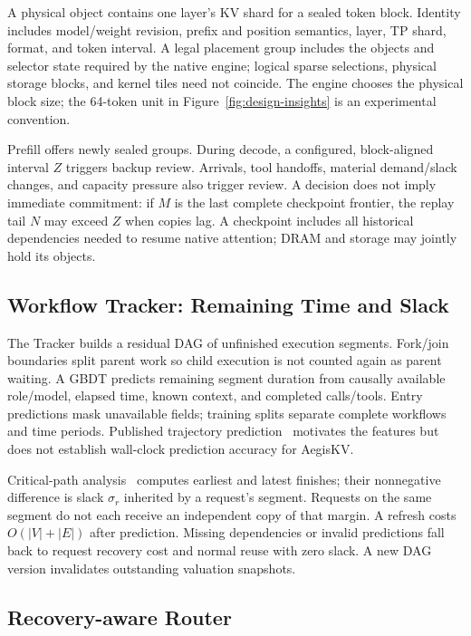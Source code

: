 A physical object contains one layer's KV shard for a sealed token block.
Identity includes model/weight revision, prefix and position semantics,
layer, TP shard, format, and token interval. A legal placement group
includes the objects and selector state required by the native engine;
logical sparse selections, physical storage blocks, and kernel tiles need
not coincide. The engine chooses the physical block size; the 64-token
unit in Figure~\ref{fig:design-insights} is an experimental convention.

Prefill offers newly sealed groups. During decode, a configured,
block-aligned interval $Z$ triggers backup review. Arrivals, tool handoffs,
material demand/slack changes, and capacity pressure also trigger review.
A decision does not imply immediate commitment: if $M$ is the last
complete checkpoint frontier, the replay tail $N$ may exceed $Z$ when
copies lag. A checkpoint includes all historical dependencies needed to
resume native attention; DRAM and storage may jointly hold its objects.

\subsection{Workflow Tracker: Remaining Time and Slack}
\label{sec:workflow-protection}

The Tracker builds a residual DAG of unfinished execution segments.
Fork/join boundaries split parent work so child execution is not counted
again as parent waiting. A GBDT predicts remaining segment duration from
causally available role/model, elapsed time, known context, and completed
calls/tools. Entry predictions mask unavailable fields; training splits
separate complete workflows and time periods. Published trajectory
prediction~\cite{zhang2026heddle} motivates the features but does not establish
wall-clock prediction accuracy for AegisKV.

Critical-path analysis~\cite{kelley1959cpm} computes earliest and latest
finishes; their nonnegative difference is slack $\sigma_r$ inherited by a
request's segment. Requests on the same segment do not each receive an
independent copy of that margin. A refresh costs $O(|V|+|E|)$ after
prediction. Missing dependencies or invalid predictions fall back to
request recovery cost and normal reuse with zero slack. A new DAG version
invalidates outstanding valuation snapshots.



\subsection{Recovery-aware Router}
\label{sec:recovery-router}

